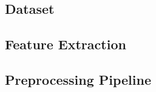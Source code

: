 
\subsection{Dataset}
\label{sec:dataset:data}




\subsection{Feature Extraction}
\label{sec:dataset:features}


\subsection{Preprocessing Pipeline}
\label{sec:dataset:preprocessing}



